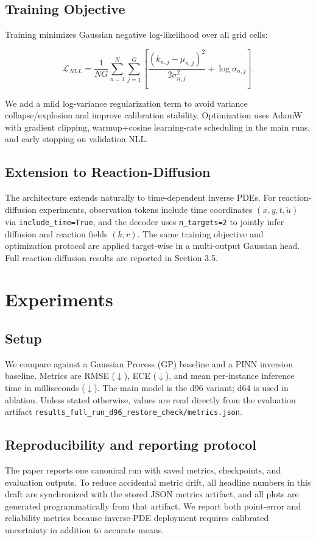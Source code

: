 \documentclass{article}
\begin{document}
\subsection{Training Objective}
Training minimizes Gaussian negative log-likelihood over all grid cells:

\begin{equation}
\mathcal{L}_{NLL} = \frac{1}{NG}\sum_{n=1}^{N}\sum_{j=1}^{G}\left[\frac{(k_{n,j} - \mu_{n,j})^2}{2\sigma_{n,j}^2} + \log \sigma_{n,j}\right].
\end{equation}

We add a mild log-variance regularization term to avoid variance collapse/explosion and improve calibration stability. Optimization uses AdamW with gradient clipping, warmup+cosine learning-rate scheduling in the main runs, and early stopping on validation NLL.

\subsection{Extension to Reaction-Diffusion}
The architecture extends naturally to time-dependent inverse PDEs. For reaction-diffusion experiments, observation tokens include time coordinates $(x, y, t, \tilde{u})$ via \texttt{include\_time=True}, and the decoder uses \texttt{n\_targets=2} to jointly infer diffusion and reaction fields $(k, r)$. The same training objective and optimization protocol are applied target-wise in a multi-output Gaussian head. Full reaction-diffusion results are reported in Section 3.5.

\section{Experiments}
\subsection{Setup}
We compare against a Gaussian Process (GP) baseline and a PINN inversion baseline. Metrics are RMSE ($\downarrow$), ECE ($\downarrow$), and mean per-instance inference time in milliseconds ($\downarrow$). The main model is the d96 variant; d64 is used in ablation. Unless stated otherwise, values are read directly from the evaluation artifact \texttt{results\_full\_run\_d96\_restore\_check/metrics.json}.

\subsection{Reproducibility and reporting protocol}
The paper reports one canonical run with saved metrics, checkpoints, and evaluation outputs. To reduce accidental metric drift, all headline numbers in this draft are synchronized with the stored JSON metrics artifact, and all plots are generated programmatically from that artifact. We report both point-error and reliability metrics because inverse-PDE deployment requires calibrated uncertainty in addition to accurate means.
\end{document}
